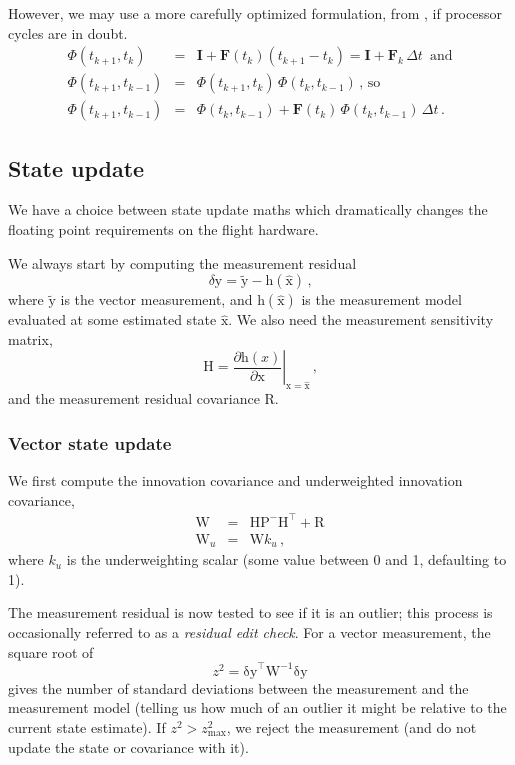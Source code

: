 \documentclass[12pt]{article}
\begin{document}
However, we may use a more carefully optimized formulation, from \cite{DSouza2011}, if processor cycles are in doubt.
\begin{eqnarray*}
\Phi(t_{k+1}, t_k) &=& \mathbf{I} + \mathbf{F}(t_k)\left(t_{k+1} - t_k\right) = \mathbf{I} + \mathbf{F}_k\,\Delta t\,\textrm{ and}\nonumber\\
\Phi(t_{k+1}, t_{k-1}) &=& \Phi(t_{k+1}, t_k)\,\Phi(t_k, t_{k-1})\,\textrm{, so}\nonumber\\
\Phi(t_{k+1}, t_{k-1}) &=& \Phi(t_k, t_{k-1}) + \mathbf{F}(t_k)\,\Phi(t_k, t_{k-1})\,\Delta t\,\textrm{.}
\end{eqnarray*}

\subsection{State update}

We have a choice between state update maths which dramatically changes the floating point requirements on the flight hardware.

We always start by computing the measurement residual
\begin{equation}
\delta\mathrm{y} = \tilde{\mathrm{y}} - \mathrm{h}(\hat{\mathrm{x}})\,\text{,}
\end{equation}
where $\tilde{\mathrm{y}}$ is the vector measurement, and $\mathrm{h}(\hat{\mathrm{x}})$ is the measurement model evaluated at some estimated state $\hat{\mathrm{x}}$. We also need the measurement sensitivity matrix,
\begin{equation}
\mathrm{H} = \left. \frac{\partial \mathrm{h}(x)}{\partial \mathrm{x}}\right|_{\mathrm{x} = \hat{\mathrm{x}}}\,\text{,}
\end{equation}
and the measurement residual covariance $\mathrm{R}$.

\subsubsection{Vector state update}

We first compute the innovation covariance and underweighted innovation covariance,
\begin{eqnarray}
\mathrm{W} &=& \mathrm{H}\mathrm{P}^{-}\mathrm{H}^\top + \mathrm{R} \\
\mathrm{W}_u &=& \mathrm{W}k_u\,\text{,}
\end{eqnarray}
where $k_u$ is the underweighting scalar (some value between 0 and 1, defaulting to 1).

The measurement residual is now tested to see if it is an outlier; this process is occasionally referred to as a \textit{residual edit check}. For a vector measurement, the square root of
\begin{equation}
z^2 = \mathrm{\delta y}^\top \mathrm{W}^{-1} \mathrm{\delta y} \label{eq:vector_residual_edit_check}
\end{equation}
gives the number of standard deviations between the measurement and the measurement model (telling us how much of an outlier it might be relative to the current state estimate). If $z^2 > z_\text{max}^2$, we reject the measurement (and do not update the state or covariance with it).
\end{document}
